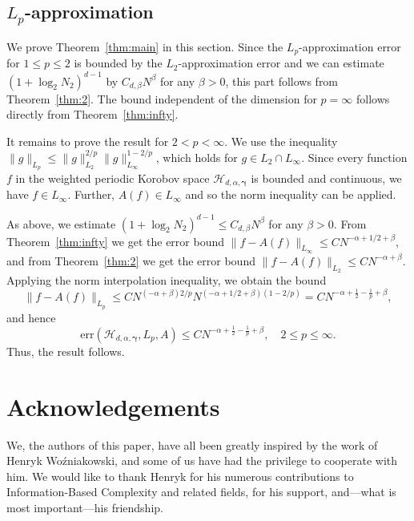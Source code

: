 \documentclass[a4paper,11pt]{article}
\newcommand{\bsgamma}{\boldsymbol{\gamma}}
\newcommand{\Hcal}{\mathcal{H}}
\begin{document}
\subsection{$L_p$-approximation}\label{sec_Lp}

We prove Theorem~\ref{thm:main} in this section. Since the $L_p$-approximation error for $1 \le p \le 2$ is bounded by the $L_2$-approximation error and we can estimate $(1+\log_2 N_2)^{d-1}$ by $C_{d,\beta} N^{\beta}$ for any $\beta > 0$, this part follows from Theorem~\ref{thm:2}. The bound independent of the dimension for $p=\infty$ follows directly from Theorem~\ref{thm:infty}.

It remains to prove the result for $2 < p < \infty$. We use the inequality $\|g\|_{L_p} \le \|g\|_{L_2}^{2/p} \|g\|_{L_\infty}^{1-2/p}$, which holds for $g \in L_2 \cap L_\infty$. Since every function $f$ in the 
weighted periodic Korobov space \( \Hcal_{d,\alpha,\bsgamma}\) is bounded and continuous, we have $f \in L_\infty$. Further, $A(f) \in L_\infty$ and so the norm inequality can be applied. 

As above, we estimate $(1+\log_2 N_2)^{d-1} \le C_{d,\beta} N^\beta$ for any $\beta > 0$. From Theorem~\ref{thm:infty} we get the error bound $\|f - A(f) \|_{L_\infty} \le C N^{-\alpha + 1/2 + \beta}$, and from Theorem~\ref{thm:2} we get the error bound $\|f - A(f)\|_{L_2} \le C N^{-\alpha + \beta}$. Applying the norm interpolation inequality, we obtain the bound
\begin{equation*}
\|f- A(f)\|_{L_p} \le C N^{(-\alpha + \beta) 2/p} N^{(-\alpha + 1/2 + \beta) (1- 2/p)} %
= C N^{-\alpha + \frac12 - \frac1p + \beta},
\end{equation*}
and hence
\begin{equation*}
\mathrm{err}(\Hcal_{d,\alpha,\bsgamma}, L_p, A) \le C N^{-\alpha + \frac12 - \frac1p + \beta}, \quad 2 \le p \le \infty.
\end{equation*}
Thus, the result follows.


\section*{Acknowledgements}

We, the authors of this paper, have all been greatly inspired by the work of Henryk Wo\'{z}niakowski, and some of us have had the privilege to cooperate with him. We would like to thank Henryk for his numerous contributions to Information-Based Complexity and related fields, for his support, and---what is most important---his friendship. 
\end{document}
